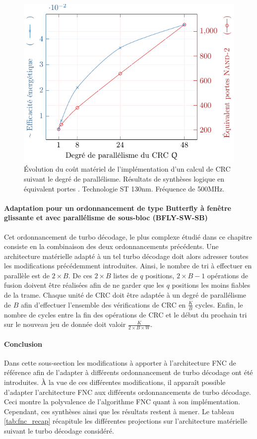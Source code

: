 \begin{figure}[!tb]
	\centering
	\includegraphics{main/ch4_fig/implem/crc.pdf}
	\caption{Évolution du coût matériel de l'implémentation d'un calcul de CRC suivant le degré de parallélisme.
	Résultats de synthèses logique en équivalent portes . Technologie ST 130nm. Fréquence de 500MHz.}
	\label{fig:crc_par}
\end{figure}

\paragraph*{Adaptation pour un ordonnancement de type Butterfly à fenêtre glissante et avec parallélisme de sous-bloc 
(BFLY-SW-SB)}
Cet ordonnancement de turbo décodage, le plus complexe étudié dans ce chapitre consiste en la combinaison des
deux ordonnancements précédents. Une architecture matérielle adapté à un tel turbo décodage doit alors adresser 
toutes les modifications précédemment introduites. Ainsi, le nombre de tri à effectuer en parallèle est de $2\times B$. 
De ces $2\times B$ listes de
$q$ positions, $2\times B-1$ opérations de fusion doivent être réalisées afin de ne garder que les $q$ positions les moins 
fiables de la trame. Chaque unité de CRC doit être adaptée à un degré de parallélisme de $B$ afin d'effectuer 
l'ensemble des 
vérifications de CRC en $\frac{K}{B}$ cycles. Enfin, le nombre de cycles entre la fin des 
opérations de CRC et le début du prochain tri sur le nouveau jeu de donnée doit valoir $\frac{K}{2\times B\times W}$.

\paragraph*{Conclusion}
Dans cette sous-section les modifications à apporter à l'architecture FNC de référence afin de l'adapter à différents 
ordonnancement de turbo décodage ont été introduites. À la vue de ces différentes modifications, il apparaît possible 
d'adapter l'architecture FNC aux différents ordonnancements de turbo décodage. Ceci montre la polyvalence de l'algorithme
FNC quant à son implémentation. Cependant, ces synthèses ainsi que les résultats restent à mener. Le tableau \ref{tab:fnc_recap} récapitule les différentes projections sur l'architecture matérielle suivant le 
turbo décodage considéré.

